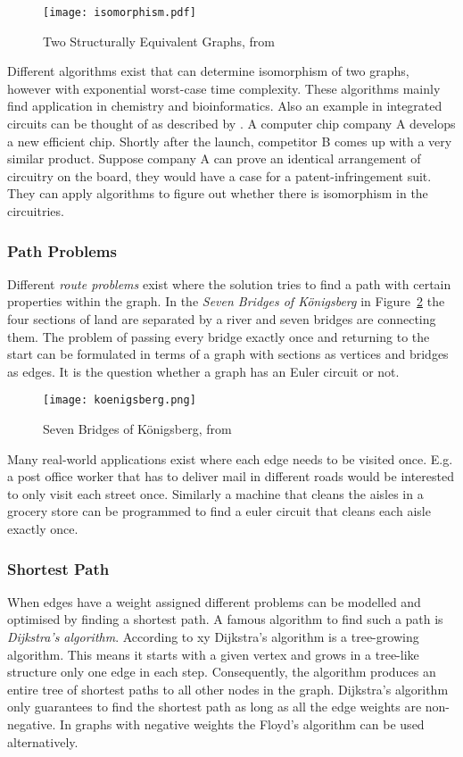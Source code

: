 \documentclass[final]{fhnwreport}       %
\begin{document}
\begin{figure}[H]
\centering
\texttt{[image: isomorphism.pdf]}
\caption{Two Structurally Equivalent Graphs, from \cite{gross_graph_2019}}
\label{fig:iso}
\end{figure}

Different algorithms exist that can determine isomorphism of two graphs, however with exponential worst-case time complexity. These algorithms mainly find application in chemistry and bioinformatics. Also an example in integrated circuits can be thought of as described by \textcite{gross_graph_2019}. A computer chip company A develops a new efficient chip. Shortly after the launch, competitor B comes up with a very similar product. Suppose company A can prove an identical arrangement of circuitry on the board, they would have a case for a patent-infringement suit. They can apply algorithms to figure out whether there is isomorphism in the circuitries.

\subsubsection{Path Problems}
Different \emph{route problems} exist where the solution tries to find a path with certain properties within the graph. In the \emph{Seven Bridges of Königsberg} in Figure~\ref{fig:konig} the four sections of land are separated by a river and seven bridges are connecting them. The problem of passing every bridge exactly once and returning to the start can be formulated in terms of a graph with sections as vertices and bridges as edges. It is the question whether a graph has an Euler circuit or not. 

\begin{figure}[H]
\centering
\texttt{[image: koenigsberg.png]}
\caption{Seven Bridges of Königsberg, from \cite{rosen_discrete_2012}}
\label{fig:konig}
\end{figure}

Many real-world applications exist where each edge needs to be visited once. E.g. a post office worker that has to deliver mail in different roads would be interested to only visit each street once. Similarly a machine that cleans the aisles in a grocery store can be programmed to find a euler circuit that cleans each aisle exactly once.

\subsubsection{Shortest Path}
When edges have a weight assigned different problems can be modelled and optimised by finding a shortest path. A famous algorithm to find such a path is \emph{Dijkstra’s algorithm}. According to xy Dijkstra's algorithm is a tree-growing algorithm. This means it starts with a given vertex and grows in a tree-like structure only one edge in each step. Consequently, the algorithm produces an entire tree of shortest paths to all other nodes in the graph. Dijkstra’s algorithm only guarantees to find the shortest path as long as all the edge weights are non-negative. In graphs with negative weights the Floyd’s algorithm
can be used alternatively.
\end{document}
